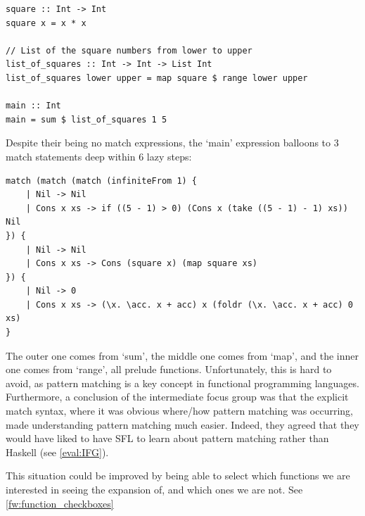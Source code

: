 \begin{lstlisting}[language=SFL]
square :: Int -> Int
square x = x * x

// List of the square numbers from lower to upper
list_of_squares :: Int -> Int -> List Int
list_of_squares lower upper = map square $ range lower upper

main :: Int
main = sum $ list_of_squares 1 5
\end{lstlisting}

\noindent Despite their being no match expressions, the `main' expression balloons to 3 match statements deep within 6 lazy steps:

\begin{lstlisting}[language=SFL]
match (match (match (infiniteFrom 1) {
    | Nil -> Nil
    | Cons x xs -> if ((5 - 1) > 0) (Cons x (take ((5 - 1) - 1) xs)) Nil
}) {
    | Nil -> Nil
    | Cons x xs -> Cons (square x) (map square xs)
}) {
    | Nil -> 0
    | Cons x xs -> (\x. \acc. x + acc) x (foldr (\x. \acc. x + acc) 0 xs)
}
\end{lstlisting}

\noindent The outer one comes from `sum', the middle one comes from `map', and the inner one comes from `range', all prelude functions. Unfortunately, this is hard to avoid, as pattern matching is a key concept in functional programming languages. Furthermore, a conclusion of the intermediate focus group was that the explicit match syntax, where it was obvious where/how pattern matching was occurring, made understanding pattern matching much easier. Indeed, they agreed that they would have liked to have SFL to learn about pattern matching rather than Haskell (see \ref{eval:IFG}). 

This situation could be improved by being able to select which functions we are interested in seeing the expansion of, and which ones we are not. See \ref{fw:function_checkboxes}


